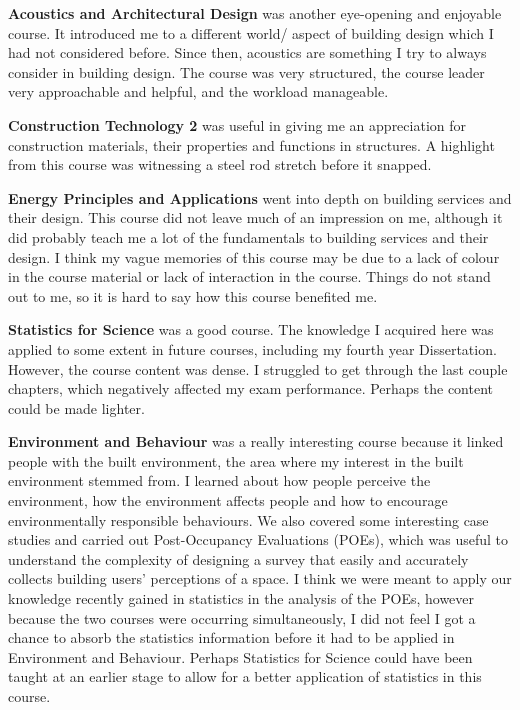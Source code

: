 \textbf{Acoustics and Architectural Design} was another eye-opening and enjoyable course.
It introduced me to a different world/ aspect of building design which I had not considered before.
Since then, acoustics are something I try to always consider in building design.
The course was very structured, the course leader very approachable and helpful, and the workload manageable.

\textbf{Construction Technology 2} was useful in giving me an appreciation for construction materials, their properties and functions in structures.
A highlight from this course was witnessing a steel rod stretch before it snapped.

\textbf{Energy Principles and Applications} went into depth on building services and their design.
This course did not leave much of an impression on me, although it did probably teach me a lot of the fundamentals to building services and their design.
I think my vague memories of this course may be due to a lack of colour in the course material or lack of interaction in the course.
Things do not stand out to me, so it is hard to say how this course benefited me.

\textbf{Statistics for Science} was a good course.
The knowledge I acquired here was applied to some extent in future courses, including my fourth year Dissertation.
However, the course content was dense.
I struggled to get through the last couple chapters, which negatively affected my exam performance.
Perhaps the content could be made lighter.

\textbf{Environment and Behaviour} was a really interesting course because it linked people with the built environment, the area where my interest in the built environment stemmed from.
I learned about how people perceive the environment, how the environment affects people and how to encourage environmentally responsible behaviours.
We also covered some interesting case studies and carried out Post-Occupancy Evaluations (POEs), which was useful to understand the complexity of designing a survey that easily and accurately collects building users' perceptions of a space.
I think we were meant to apply our knowledge recently gained in statistics in the analysis of the POEs, however because the two courses were occurring simultaneously, I did not feel I got a chance to absorb the statistics information before it had to be applied in Environment and Behaviour.
Perhaps Statistics for Science could have been taught at an earlier stage to allow for a better application of statistics in this course.


